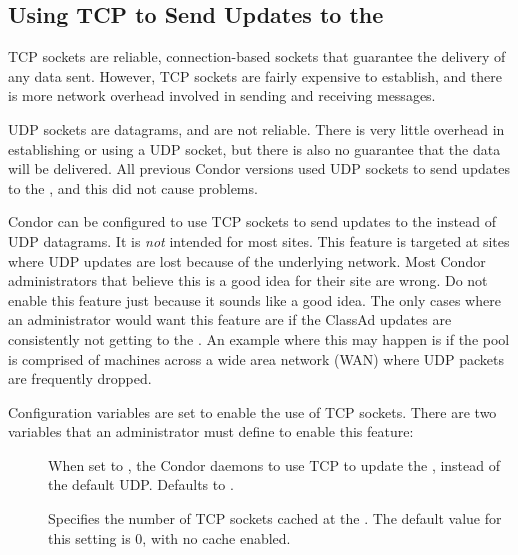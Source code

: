 \subsection{\label{sec:tcp-collector-update}Using TCP to Send Updates to
the }


TCP sockets are reliable, connection-based sockets that guarantee
the delivery of any data sent.
However, TCP sockets are fairly expensive to establish, and there is more
network overhead involved in sending and receiving messages.

UDP sockets are datagrams, and are not reliable.
There is very little overhead in establishing or using a UDP socket,
but there is also no guarantee that the data will be delivered.
All previous Condor versions used UDP sockets to send updates to
the , and this did not cause problems.

Condor can be configured to use TCP
sockets to send updates to the  instead of
UDP datagrams.
It is \emph{not} intended for most sites.
This feature is targeted at sites where UDP updates are
lost because of the underlying network.
Most Condor administrators that believe this is a good idea for
their site are wrong.
Do not enable this feature just because it sounds like a good idea.
The only cases where an administrator would want this feature are if
the ClassAd updates are consistently not getting to the
.
An example where this may happen is if the pool is comprised of
machines across a wide area network (WAN) where UDP packets are
frequently dropped.

Configuration variables are set to enable the use of TCP sockets.
There are two variables that an
administrator must define to enable this feature:

\begin{description}

\item[]
  When set to , the Condor daemons to use TCP to
  update the , instead of the default UDP.
  Defaults to .

\item[] 
  Specifies the number of TCP sockets cached at the .
  The default value for this setting is 0, with no cache enabled.

\end{description}

